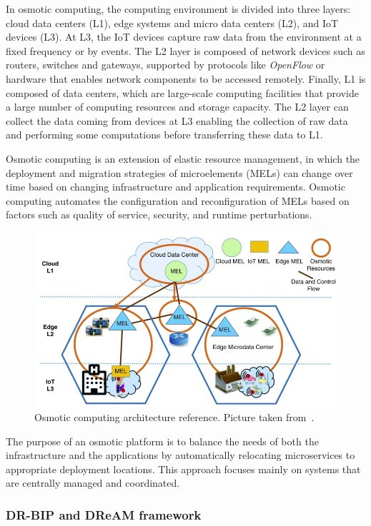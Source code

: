 In osmotic computing, the computing environment is divided into three layers: cloud data centers (L1), edge systems and micro data centers (L2), and
IoT devices (L3).
At L3, the IoT devices capture raw data from the environment at a fixed frequency or by events. The L2 layer is composed of network devices such as
routers, switches and gateways, supported by protocols like \emph{OpenFlow} or hardware that enables network components to be accessed remotely.
Finally, L1 is composed of data centers, which are large-scale computing facilities that provide a large number of computing resources and storage
capacity.
The L2 layer can collect the data coming from devices at L3 enabling the collection of raw data and performing some computations before transferring
these data to L1.

Osmotic computing is an extension of elastic resource management, in which the deployment and migration strategies of microelements (MELs) can change
over time based on changing infrastructure and application requirements. Osmotic computing automates the configuration and reconfiguration of MELs
based on factors such as quality of service, security, and runtime perturbations.

\begin{figure}[ht]
	\centering
	\includegraphics[width=0.8\linewidth]{figures/osmotic-architecture.png}
	\caption[Osmotic computing architecture reference]{Osmotic computing architecture reference. Picture taken from~\Cite{8781958}.}
	\label{fig:osmotic-computing}
\end{figure}

The purpose of an osmotic platform is to balance the needs of both the infrastructure and the applications by automatically relocating microservices
to appropriate deployment locations. This approach focuses mainly on systems that are centrally managed and coordinated.

\subsubsection{DR-BIP and DReAM framework}

